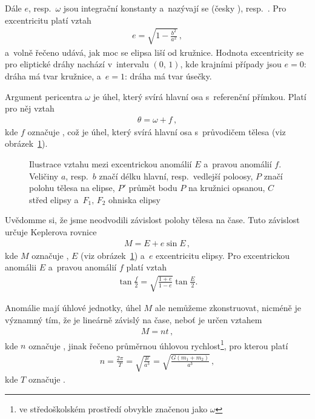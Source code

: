 \documentclass[A4paper, 12pt, oneside, openany]{book}
\begin{document}
Dále $e$, resp.\ $\omega$ jsou integrační konstanty a~nazývají se  (česky ), resp.\ . Pro excentricitu platí vztah
\begin{align}
	e=\sqrt{1-\frac{b^2}{a^2}}\,,
\end{align}
a~volně řečeno udává, jak moc se elipsa liší od kružnice. Hodnota excentricity se pro eliptické dráhy nachází v~intervalu $(0,\,1)$, kde krajními případy jsou $e=0$: dráha má tvar kružnice, a~$e=1$: dráha má tvar úsečky.

Argument pericentra $\omega$ je úhel, který svírá hlavní osa s~referenční přímkou. Platí pro něj vztah
\begin{align}
	\theta=\omega+f\,,
\end{align}
kde $f$ označuje , což je úhel, který svírá hlavní osa s~průvodičem tělesa (viz obrázek~\ref{fig:E}).

\begin{figure}
	\centering
	\caption{Ilustrace vztahu mezi excentrickou anomálií $E$ a~pravou anomálií $f$. Veličiny $a$, resp.\ $b$ značí délku hlavní, resp.\ vedlejší poloosy, $P$ značí polohu tělesa na elipse, $P'$ průmět bodu $P$ na kružnici opsanou, $C$ střed elipsy a~$F_1,\,F_2$ ohniska elipsy} \label{fig:E}
\end{figure}

Uvědomme si, že jsme neodvodili závislost polohy tělesa na čase. Tuto závislost určuje Keplerova rovnice
\begin{align} \label{eq:kepler}
M = E + e\sin E\,,
\end{align}
kde $M$ označuje , $E$  (viz obrázek~\ref{fig:E}) a~$e$ excentricitu elipsy. Pro excentrickou anomálii $E$ a~pravou anomálií $f$ platí vztah
\begin{align} \label {eq:fE}
	\tan \frac{f}{2} = \sqrt{\frac{1+e}{1-e}}\tan \frac{E}{2}.
\end{align}

Anomálie mají úhlové jednotky, úhel $M$ ale nemůžeme zkonstruovat, nicméně je významný tím, že je lineárně závislý na čase, neboť je určen vztahem 
\begin{align} \label{eq:M}
	M=nt\,,
\end{align}
kde $n$ označuje , jinak řečeno průměrnou úhlovou rychlost\footnote{ve středoškolském prostředí obvykle značenou jako $\omega$}, pro kterou platí
\begin{align} \label{eq:n}
	n=\frac{2\pi}{T}=\sqrt{\frac{\mu}{a^3}}=\sqrt{\frac{G(m_1+m_2)}{a^3}}\,,
\end{align}
kde $T$ označuje .
\end{document}
